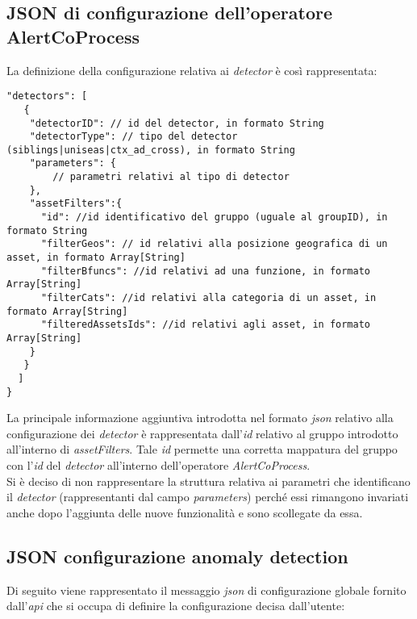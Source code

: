 \subsection{JSON di configurazione dell'operatore AlertCoProcess}\label{sec:json-detectors}
La definizione della configurazione relativa ai \textit{detector} è così rappresentata:
\begin{verbatim}
"detectors": [
   {
    "detectorID": // id del detector, in formato String
    "detectorType": // tipo del detector (siblings|uniseas|ctx_ad_cross), in formato String
    "parameters": {
		// parametri relativi al tipo di detector    
    },
    "assetFilters":{
      "id": //id identificativo del gruppo (uguale al groupID), in formato String
      "filterGeos": // id relativi alla posizione geografica di un asset, in formato Array[String]
      "filterBfuncs": //id relativi ad una funzione, in formato Array[String]
      "filterCats": //id relativi alla categoria di un asset, in formato Array[String]
      "filteredAssetsIds": //id relativi agli asset, in formato Array[String]
    }
   }
  ]
}
\end{verbatim}
La principale informazione aggiuntiva introdotta nel formato \textit{\gls{json}} relativo alla configurazione dei \textit{detector} è rappresentata dall'\textit{id} relativo al gruppo introdotto all'interno di \textit{assetFilters}. Tale \textit{id} permette una corretta mappatura del gruppo con l'\textit{id} del \textit{detector} all'interno dell'operatore \textit{AlertCoProcess}.\\
Si è deciso di non rappresentare la struttura relativa ai parametri che identificano il \textit{detector} (rappresentanti dal campo \textit{parameters}) perché essi rimangono invariati anche dopo l'aggiunta delle nuove funzionalità e sono scollegate da essa.

\subsection{JSON configurazione anomaly detection}
Di seguito viene rappresentato il messaggio \textit{\gls{json}} di configurazione globale fornito dall'\textit{\gls{api}} che si occupa di definire la configurazione decisa dall'utente:

